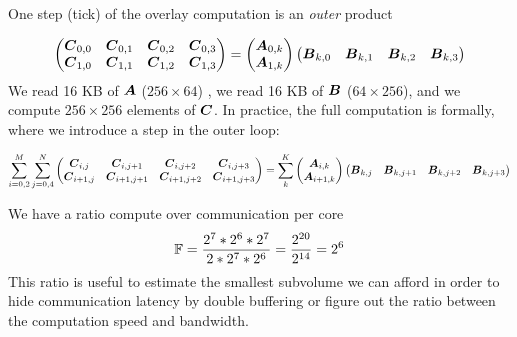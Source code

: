 \documentclass[journal]{IEEEtran}
\begin{document}
One step (tick) of the overlay computation is an {\em outer} product

{\small \begin{equation}
  \label{eq:gemmA}
  \begin{pmatrix}
    \Vc{C}_{0,0}  &  \Vc{C}_{0,1}  & \Vc{C}_{0,2}  &\Vc{C}_{0,3} \\
    \Vc{C}_{1,0}  & \Vc{C}_{1,1}   & \Vc{C}_{1,2}  & \Vc{C}_{1,3} \\
  \end{pmatrix}    =
  \begin{pmatrix}
    \Vc{A}_{0,k}  \\
    \Vc{A}_{1,k}   \\
  \end{pmatrix}  
  \begin{pmatrix}
    \Vc{B}_{k,0}  &  \Vc{B}_{k,1}  & \Vc{B}_{k,2}  &\Vc{B}_{k,3} \\
  \end{pmatrix}    
\end{equation}
} We read 16 KB of ${\boldsymbol A}$ ($256 \times 64$) , we read 16 KB of
${\boldsymbol B}$ ($64 \times 256$), and we compute $256 \times 256$ elements
of ${\boldsymbol C}$. In practice, the full computation is formally, where we
introduce a step in the outer loop:




{\small \begin{equation*}
    \sum_{i=0,2}^M
    \sum_{j=0,4}^N
  \begin{pmatrix}
    {\boldsymbol C}_{i,j}  & {\boldsymbol C}_{i,j+1}    & {\boldsymbol C}_{i,j+2}    &{\boldsymbol C}_{i,j+3} \\
    {\boldsymbol C}_{i+1,j}  & {\boldsymbol C}_{i+1,j+1}   & {\boldsymbol C}_{i+1,j+2}  & {\boldsymbol C}_{i+1,j+3} \\
  \end{pmatrix}    = \sum_k^K
  \begin{pmatrix}
    {\boldsymbol A}_{i,k}  \\
    {\boldsymbol A}_{i+1,k}   \\
  \end{pmatrix}  
  \begin{pmatrix}
    {\boldsymbol B}_{k,j}  &  {\boldsymbol B}_{k,j+1}  & {\boldsymbol B}_{k,j+2}  &{\boldsymbol B}_{k,j+3} \\
  \end{pmatrix}    
\end{equation*}
}



We have a ratio compute over communication per core
\begin{equation}
  \label{eq:ratio}
  \F = \frac{2^7 * 2^6 * 2^7 } { 2* 2^7 * 2^6} = \frac{2^{20}}{2^{14}} = 2^6
\end{equation}
This ratio is useful to estimate the smallest subvolume we can afford
in order to hide communication latency by double buffering or figure
out the ratio between the computation speed and bandwidth. 
\end{document}
